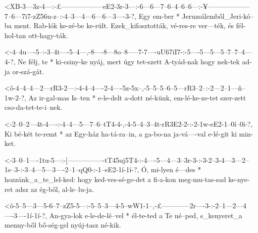 

  {<XB-3---3z-4---:-£------------------eE2-3r-3---:-6---6---7--6--4--6--6---:-¥------------------7--6---7i7-zZ56u-z--:-4--3---4---6---6---3----3-?,}
  {    Egy em-ber * Jeruzsálemből_Jeri-kó--ba ment. Rab-lók ke-zé-be ke-rült. Ezek_kifosztották, vé-res-re  ver---ték, és fél-hol-tan ott-hagy-ták.}


  {<-4--4u----5--:-3--4t----5--4---,-8----8---8o--8-----7-7----uU67iI7-:-5----5---5---5--7--7--4---4-?,}
  {  Ne félj, te * ki-csiny-ke nyáj, mert úgy tet-szett A-tyád-nak       hogy nek-tek ad-ja or-szá-gát.}




  {<ô-4--4--4---2---rR3-2---:-4-4--4----2-4----5z-5x--,-5--5--5--6--5---rR3--2--:-2---2--1---ñ--1w-2-?,}
  {   Az ir-gal-mas Is--ten * e-le-delt a-dott né-künk, em-lé-ke-ze-tet szer-zett cso-da-tet-te-i--nek.}

  {<-2--0--2---4t-4----:-4--4---5---7--6--tT4-4-,-4-5--4--3--4t-rR3E2-2-:-2-1w-eE2-1--0í--0í-?,}
  {  Ki bé-két te-remt * az Egy-ház ha-tá-ra--in, a ga-bo-na ja-vá----val e-lé-git ki min-ket.}

  {<-3--0--1----1tu-5---:-[----------------tT45uj5T4-:-4----5---4---3--3r-3-:-3-2--3-4---3---2--1e--3-:-3--4---5---3----2--1--qQ0-:-1--eE2-1í-1í-?,}
  {  Ó, mi-lyen é---des * hozzánk_a_te_lel-ked:        hogy ked-ves-sé-ge-det a fi-a-kon meg-mu-tas-sad ke-nye-ret adsz az ég-ből,  al-le--lu-ja.}


  {<ô-5--5---3---5-6--7--zZ5-5---:-5--5--3---4-5--wW1-1--,-£------------2r----3-:-2--1---2---4----3----1í-1í-?,}
  {   An-gya-lok e-le-de-lé--vel * él-te-ted a Te né--ped, s_kenyeret_a menny-ből bő-ség-gel nyúj-tasz né-kik.}


